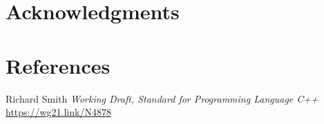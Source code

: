 \documentclass{wg21}
\begin{document}
\section{Acknowledgments}

\section{References}
\renewcommand{\section}[2]{}%

\begin{thebibliography}{9}

Richard Smith
\emph{Working Draft, Standard for Programming Language C++}\newline
\url{https://wg21.link/N4878}

\end{thebibliography}
\end{document}
